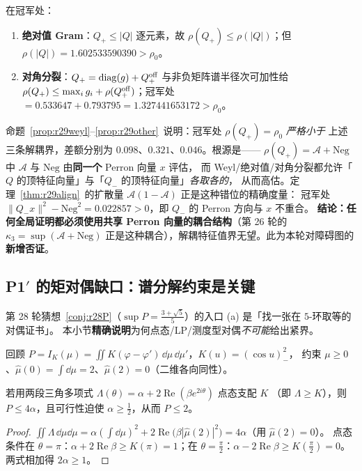 \begin{proposition}\label{prop:r29other}
在冠军处：
\begin{enumerate}[label=(\alph*),itemsep=1pt]
\item \textbf{绝对值 Gram}：$Q_+\le|Q|$ 逐元素，故 $\rho(Q_+)\le\rho(|Q|)$；但 $\rho(|Q|)=1.602533590390>\rho_0$。
\item \textbf{对角分裂}：$Q_+=\operatorname{diag}(g)+Q_+^{\rm off}$ 与非负矩阵谱半径次可加性给
$\rho(Q_+)\le\max_i g_i+\rho(Q_+^{\rm off})$；冠军处 $=0.533647+0.793795=1.327441653172>\rho_0$。
\end{enumerate}
\end{proposition}
\begin{remark}[为什么解耦必然失败]\label{rem:r29whydec}
命题~\ref{prop:r29weyl}--\ref{prop:r29other}~说明：冠军处 $\rho(Q_+)=\rho_0$ \emph{严格小于}
上述三条解耦界，差额分别为 $0.098$、$0.321$、$0.046$。根源是——
$\rho(Q_+)=\mathcal A+\mathrm{Neg}$ 中 $\mathcal A$ 与 $\mathrm{Neg}$ 由\textbf{同一个} Perron 向量 $x$ 评估，
而 Weyl/绝对值/对角分裂都允许「$Q$ 的顶特征向量」与「$Q_-$ 的顶特征向量」\emph{各取各的}，
从而高估。定理~\ref{thm:r29align}~的扩散量 $\mathcal A(1-\mathcal A)$ 正是这种错位的精确度量：
冠军处 $\|Q_-x\|^2-\mathrm{Neg}^2=0.022857>0$，即 $Q_-$ 的 Perron 方向与 $x$ 不重合。
\textbf{结论：任何全局证明都必须使用共享 Perron 向量的耦合结构}（第 26 轮的 $\kappa_3=\sup(\mathcal A+\mathrm{Neg})$
正是这种耦合），解耦特征值界无望。此为本轮对障碍图的\textbf{新增否证}。
\end{remark}

\subsection{P1$'$ 的矩对偶缺口：谱分解约束是关键}\label{sec:r29:dual}

第 28 轮猜想~\ref{conj:r28P}（$\sup P=\frac{3+\sqrt5}5$）的入口 (a) 是「找一张在 $5$-环取等的对偶证书」。
本小节\textbf{精确说明}为何点态/LP/测度型对偶\emph{不可能}给出紧界。

回顾 $P=I_K(\mu)=\iint K(\varphi-\varphi')\,\dd\mu\,\dd\mu'$，$K(u)=(\cos u)_-^2$，
约束 $\mu\ge0$、$\widehat\mu(0)=\int\dd\mu=2$、$\widehat\mu(2)=0$（二维各向同性）。

\begin{proposition}[点态支配对偶的缺口，已证]\label{prop:r29pointwise}
若用两段三角多项式 $\Lambda(\theta)=\alpha+2\operatorname{Re}(\beta e^{2i\theta})$ 点态支配 $K$
（即 $\Lambda\ge K$），则 $P\le4\alpha$，且可行性迫使 $\alpha\ge\frac12$，从而 $P\le2$。
\end{proposition}
\begin{proof}
$\iint\Lambda\,\dd\mu\dd\mu=\alpha(\int\dd\mu)^2+2\operatorname{Re}\bigl(\beta|\widehat\mu(2)|^2\bigr)=4\alpha$（用 $\widehat\mu(2)=0$）。
点态条件在 $\theta=\pi$：$\alpha+2\operatorname{Re}\beta\ge K(\pi)=1$；在 $\theta=\frac\pi2$：$\alpha-2\operatorname{Re}\beta\ge K(\frac\pi2)=0$。
两式相加得 $2\alpha\ge1$。
\end{proof}

